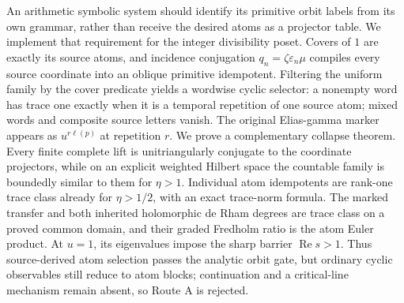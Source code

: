An arithmetic symbolic system should identify its primitive orbit labels from
its own grammar, rather than receive the desired atoms as a projector table.
We implement that requirement for the integer divisibility poset. Covers of
\(1\) are exactly its source atoms, and incidence conjugation
\(q_n=\zeta\varepsilon_n\mu\) compiles every source coordinate into an
oblique primitive idempotent. Filtering the uniform family by the cover
predicate yields a wordwise cyclic selector: a nonempty word has trace one
exactly when it is a temporal repetition of one source atom; mixed words and
composite source letters vanish. The original Elias-gamma marker appears as
\(u^{r\ell(p)}\) at repetition \(r\). We prove a complementary collapse
theorem. Every finite complete lift is unitriangularly conjugate to the
coordinate projectors, while on an explicit weighted Hilbert space the
countable family is boundedly similar to them for \(\eta>1\). Individual
atom idempotents are rank-one trace class already for \(\eta>1/2\), with an
exact trace-norm formula. The marked transfer and both inherited
holomorphic de Rham degrees are trace class on a proved common domain, and
their graded Fredholm ratio is the atom Euler product. At \(u=1\), its
eigenvalues impose the sharp barrier \(\operatorname{Re}s>1\). Thus
source-derived atom selection passes the analytic orbit gate, but ordinary
cyclic observables still reduce to atom blocks; continuation and a
critical-line mechanism remain absent, so Route A is rejected.
